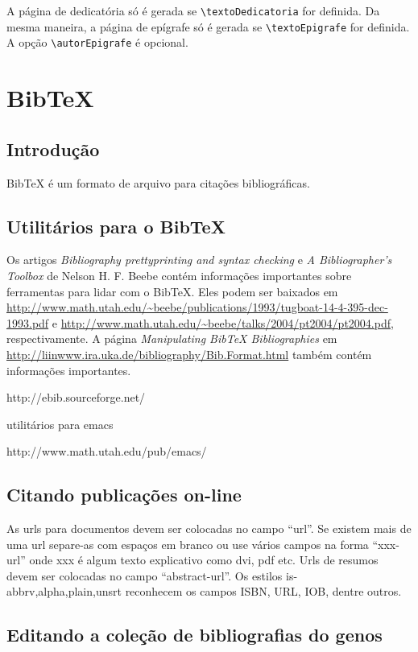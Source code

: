 \documentclass[12pt,brazil]{book}
\begin{document}
A página de dedicatória só é gerada se \verb!\textoDedicatoria! for
definida. Da mesma maneira, a página de epígrafe só é gerada se
\verb!\textoEpigrafe! for definida. A opção \verb!\autorEpigrafe! é
opcional.

\chapter{BibTeX}
\label{cha:bibtex}

\section{Introdução}
\label{sec:introducao-1}

BibTeX é um formato de arquivo para citações bibliográficas.

\section{Utilitários para o BibTeX}
\label{sec:utilitarios-para-o}

Os artigos \textit{Bibliography prettyprinting and syntax checking} e
\textit{A Bibliographer's Toolbox} de Nelson H. F. Beebe contém
informações importantes sobre ferramentas para lidar com o BibTeX.
Eles podem ser baixados em
\url{http://www.math.utah.edu/~beebe/publications/1993/tugboat-14-4-395-dec-1993.pdf}
 e \url{http://www.math.utah.edu/~beebe/talks/2004/pt2004/pt2004.pdf},
respectivamente. A página \textit{Manipulating BibTeX Bibliographies}
em \url{http://liinwww.ira.uka.de/bibliography/Bib.Format.html} também
contém informações importantes.

http://ebib.sourceforge.net/

utilitários para emacs

http://www.math.utah.edu/pub/emacs/

\section{Citando publicações on-line}
\label{sec:citando-publ-line}

As urls para documentos devem ser colocadas no campo ``url''. Se
existem mais de uma url separe-as com espaços em branco ou use vários
campos na forma ``xxx-url'' onde xxx é algum texto explicativo como
dvi, pdf etc. Urls de resumos devem ser colocadas no campo
``abstract-url''. Os estilos is-{abbrv,alpha,plain,unsrt} reconhecem
os campos ISBN, URL, IOB, dentre outros.

\section{Editando a coleção de bibliografias do genos}
\label{sec:editando-colecao-de}
\end{document}
